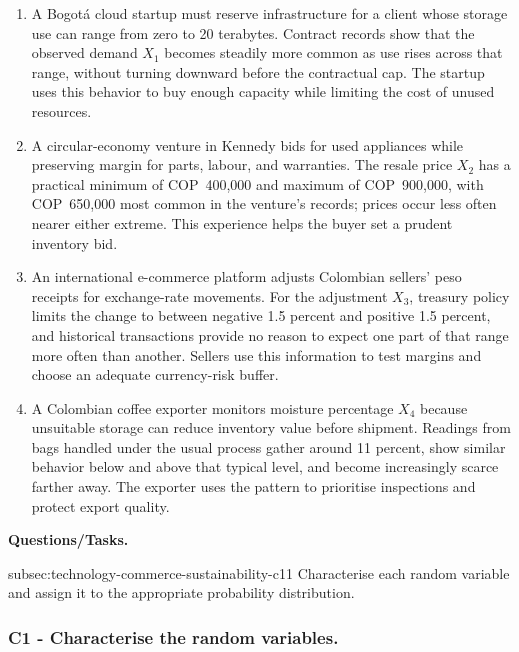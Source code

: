 	\begin{enumerate}
		\item A Bogotá cloud startup must reserve infrastructure for a client whose storage use can range from zero to 20 terabytes. Contract records show that the observed demand \(X_1\) becomes steadily more common as use rises across that range, without turning downward before the contractual cap. The startup uses this behavior to buy enough capacity while limiting the cost of unused resources.
		\item A circular-economy venture in Kennedy bids for used appliances while preserving margin for parts, labour, and warranties. The resale price \(X_2\) has a practical minimum of COP~400,000 and maximum of COP~900,000, with COP~650,000 most common in the venture's records; prices occur less often nearer either extreme. This experience helps the buyer set a prudent inventory bid.
		\item An international e-commerce platform adjusts Colombian sellers' peso receipts for exchange-rate movements. For the adjustment \(X_3\), treasury policy limits the change to between negative 1.5 percent and positive 1.5 percent, and historical transactions provide no reason to expect one part of that range more often than another. Sellers use this information to test margins and choose an adequate currency-risk buffer.
		\item A Colombian coffee exporter monitors moisture percentage \(X_4\) because unsuitable storage can reduce inventory value before shipment. Readings from bags handled under the usual process gather around 11 percent, show similar behavior below and above that typical level, and become increasingly scarce farther away. The exporter uses the pattern to prioritise inspections and protect export quality.
	\end{enumerate}

	\textbf{Questions/Tasks.}
	\begin{enumerate}
		\CriterionTask
		{subsec:technology-commerce-sustainability-c1}{1}
		{Characterise each random variable and assign it to the appropriate probability distribution.}
	\end{enumerate}

	\subsubsection*{C1 - Characterise the random variables.}
	\label{subsec:technology-commerce-sustainability-c1}

